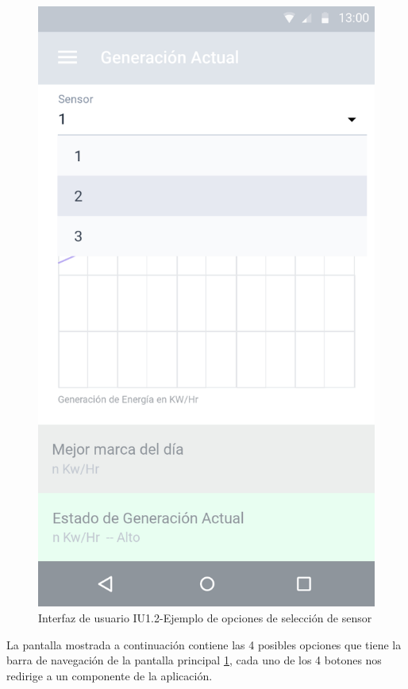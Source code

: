 \begin{figure}[H]
	\centering
	\includegraphics[scale=0.70]{Capitulo4/software/submodulos/images/monitoreo_sel.png}
	\caption{Interfaz de usuario IU1.2-Ejemplo de opciones de selección de sensor}
	\label{fig:monitoreo}
\end{figure}

La pantalla mostrada a continuación contiene las 4 posibles opciones que tiene la barra de navegación de la pantalla principal \ref{fig:monitoreo}, cada uno de los 4 botones nos redirige a un componente de la aplicación.

